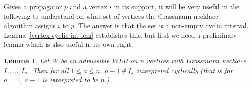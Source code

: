 \documentclass[11pt]{article}
\newcommand{\cP}{\mathcal{P}}
\newtheorem{lem}[thm]{Lemma}
\theoremstyle{remark}
\theoremstyle{definition}
\begin{document}
%



Given a propagator $p$ and a vertex $i$ in its support, it will be very useful in the following to understand on what set of vertices the Grassmann necklace algorithm assigns $i$ to $p$.  The answer is that the set is a non-empty cyclic interval.  Lemma~\ref{vertex cyclic int lem} establishes this, but first we need a preliminary lemma which is also useful in its own right.

\begin{lem}\label{lem last vert}
  Let W be an admissible WLD on $n$ vertices with Grassmann necklace $I_1, \ldots, I_n$.  Then for all $1\leq a \leq n$, $a-1 \not\in I_a$ interpreted cyclically (that is for $a=1$, $a-1$ is interpreted to be $n$.)
\end{lem}
\end{document}
